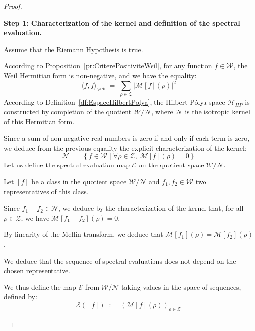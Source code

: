 \documentclass[Riemann_Hypothesis.tex]{subfiles}
\begin{document}
\begin{proof}
    \begin{part_proof}
        \textbf{Step 1: Characterization of the kernel and definition of the spectral evaluation.} \par
        Assume that the Riemann Hypothesis is true. \par
        According to {Proposition}~\ref{pr:CriterePositiviteWeil}, for any function $f \in \mathcal{W}$, the Weil Hermitian form is non-negative, and we have the equality:
        \begin{equation*}
            \langle f, f \rangle_{\mathcal{HP}} \;=\; \sum_{\rho \in \mathcal{Z}} \left| \mathcal{M}[f](\rho) \right|^2
        \end{equation*}
        According to Definition~\ref{df:EspaceHilbertPolya}, the Hilbert-Pólya space $\mathcal{H}_{HP}$ is constructed by completion of the quotient $\mathcal{W} / \mathcal{N}$, where $\mathcal{N}$ is the isotropic kernel of this Hermitian form. \par
        Since a sum of non-negative real numbers is zero if and only if each term is zero, we deduce from the previous equality the explicit characterization of the kernel:
        \begin{equation*}
            \mathcal{N} \;=\; \left\{ f \in \mathcal{W} \mid \forall \rho \in \mathcal{Z}, \; \mathcal{M}[f](\rho) = 0 \right\}
        \end{equation*}
        Let us define the spectral evaluation map $\mathcal{E}$ on the quotient space $\mathcal{W} / \mathcal{N}$. \par
        Let $[f]$ be a class in the quotient space $\mathcal{W} / \mathcal{N}$ and $f_1, f_2 \in \mathcal{W}$ two representatives of this class. \par
        Since $f_1 - f_2 \in \mathcal{N}$, we deduce by the characterization of the kernel that, for all $\rho \in \mathcal{Z}$, we have $\mathcal{M}[f_1 - f_2](\rho) = 0$. \par
        By linearity of the Mellin transform, we deduce that $\mathcal{M}[f_1](\rho) = \mathcal{M}[f_2](\rho)$. \par
        We deduce that the sequence of spectral evaluations does not depend on the chosen representative. \par
        We thus define the map $\mathcal{E}$ from $\mathcal{W} / \mathcal{N}$ taking values in the space of sequences, defined by:
        \begin{equation*}
            \mathcal{E}([f]) \;:=\; \left( \mathcal{M}[f](\rho) \right)_{\rho \in \mathcal{Z}}
        \end{equation*}
    \end{part_proof}


\end{proof}
\end{document}
